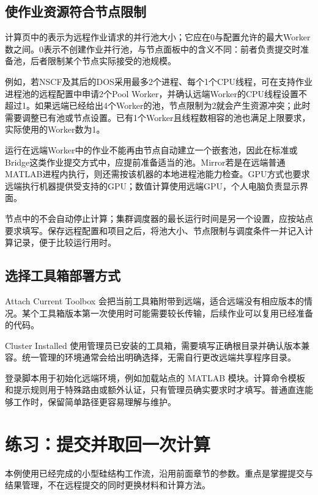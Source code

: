 \subsection{使作业资源符合节点限制}

计算页中的表示为远程作业请求的并行池大小；它应在0与配置允许的最大Worker数之间。0表示不创建作业并行池，与节点面板中的含义不同：前者负责提交时准备池，后者限制某个节点实际接受的池规模。

例如，若NSCF及其后的DOS采用最多2个进程、每个1个CPU线程，可在支持作业进程池的远程配置中申请2个Pool Worker，并确认远端Worker的CPU线程设置不超过1。如果远端已经给出4个Worker的池，节点限制为2就会产生资源冲突；此时需要调整已有池或节点设置。已有1个Worker且线程数相容的池也满足上限要求，实际使用的Worker数为1。

运行在远端Worker中的作业不能再由节点自动建立一个嵌套池，因此在标准或Bridge这类作业提交方式中，应提前准备适当的池。Mirror若是在远端普通MATLAB\regmark{}进程内执行，则还需按该机器的本地进程池能力检查。GPU方式也要求远端执行机器提供受支持的GPU；数值计算使用远端GPU，个人电脑负责显示界面。

节点中的不会自动停止计算；集群调度器的最长运行时间是另一个设置，应按站点要求填写。保存远程配置和项目之后，将池大小、节点限制与调度条件一并记入计算记录，便于比较运行用时。


\subsection{选择工具箱部署方式}

Attach Current Toolbox 会把当前工具箱附带到远端，适合远端没有相应版本的情况。某个工具箱版本第一次使用时可能需要较长传输，后续作业可以复用已经准备的代码。

Cluster Installed 使用管理员已安装的工具箱，需要填写正确根目录并确认版本兼容。统一管理的环境通常会给出明确选择，无需自行更改远端共享程序目录。

登录脚本用于初始化远端环境，例如加载站点的 MATLAB\regmark{} 模块。计算命令模板和提示规则用于特殊路由或额外认证，只有管理员确实要求时才填写。普通直连能够工作时，保留简单路径更容易理解与维护。

\section{练习：提交并取回一次计算}

本例使用已经完成的小型硅结构工作流，沿用前面章节的参数。重点是掌握提交与结果管理，不在远程提交的同时更换材料和计算方法。

